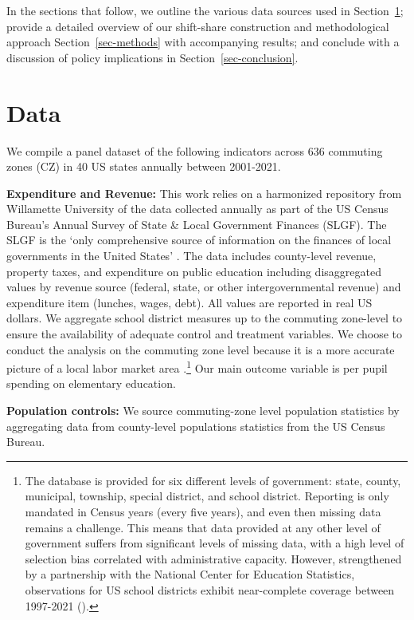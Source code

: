 \documentclass[
  10pt,
]{article}
\begin{document}
In the sections that follow, we outline the various data sources used in
Section~\ref{sec-data}; provide a detailed overview of our shift-share
construction and methodological approach Section~\ref{sec-methods} with
accompanying results; and conclude with a discussion of policy
implications in Section~\ref{sec-conclusion}.

\section{Data}\label{sec-data}

We compile a panel dataset of the following indicators across 636
commuting zones (CZ) in 40 US states annually between 2001-2021.

\textbf{Expenditure and Revenue:} This work relies on a harmonized
repository from Willamette University of the data collected annually as
part of the US Census Bureau's Annual Survey of State \& Local
Government Finances (SLGF). The SLGF is the `only comprehensive source
of information on the finances of local governments in the United
States' \autocite{pierson}. The data includes county-level revenue,
property taxes, and expenditure on public education including
disaggregated values by revenue source (federal, state, or other
intergovernmental revenue) and expenditure item (lunches, wages, debt).
All values are reported in real US dollars. We aggregate school district
measures up to the commuting zone-level to ensure the availability of
adequate control and treatment variables. We choose to conduct the
analysis on the commuting zone level because it is a more accurate
picture of a local labor market area
\autocite{carpenterWhenUseCommuting2022}.\footnote{The database is
  provided for six different levels of government: state, county,
  municipal, township, special district, and school district. Reporting
  is only mandated in Census years (every five years), and even then
  missing data remains a challenge. This means that data provided at any
  other level of government suffers from significant levels of missing
  data, with a high level of selection bias correlated with
  administrative capacity. However, strengthened by a partnership with
  the National Center for Education Statistics, observations for US
  school districts exhibit near-complete coverage between 1997-2021
  (\textcite{pierson}).} Our main outcome variable is per pupil spending
on elementary education.

\textbf{Population controls:} We source commuting-zone level population
statistics by aggregating data from county-level populations statistics
from the US Census Bureau.
\end{document}
